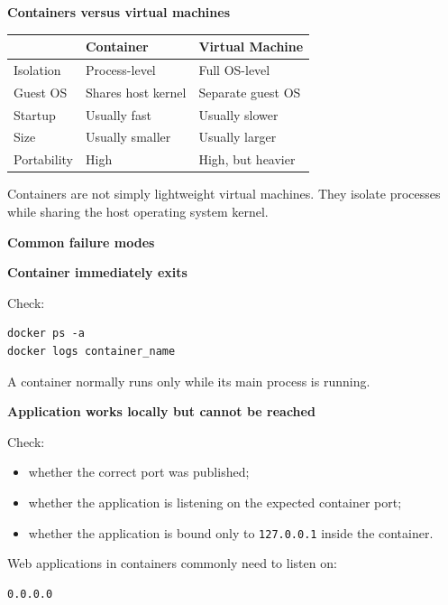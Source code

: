\documentclass[11pt,letterpaper]{article}
\begin{document}
\textbf{Containers versus virtual machines}

\begin{center}
\begin{tabularx}{\textwidth}{lXX}
\toprule
 & Container & Virtual Machine \\
\midrule
Isolation & Process-level & Full OS-level \\
Guest OS & Shares host kernel & Separate guest OS \\
Startup & Usually fast & Usually slower \\
Size & Usually smaller & Usually larger \\
Portability & High & High, but heavier \\
\bottomrule
\end{tabularx}
\end{center}

Containers are not simply lightweight virtual machines. They isolate
processes while sharing the host operating system kernel.



\textbf{Common failure modes}

\textbf{Container immediately exits}

Check:

\begin{lstlisting}
docker ps -a
docker logs container_name
\end{lstlisting}

A container normally runs only while its main process is running.

\textbf{Application works locally but cannot be reached}

Check:

\begin{itemize}[leftmargin=*]
    \item whether the correct port was published;
    \item whether the application is listening on the expected container port;
    \item whether the application is bound only to \texttt{127.0.0.1} inside the
    container.
\end{itemize}

Web applications in containers commonly need to listen on:

\begin{lstlisting}
0.0.0.0
\end{lstlisting}
\end{document}
